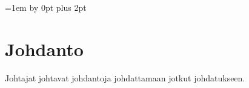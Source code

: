\documentclass[12pt,a4paper]{article}
\begin{document}
%
%
%
%
%

\newpage
\thispagestyle{empty}
\tableofcontents
\newpage
\setcounter{page}{1}
\parskip=1em \advance\parskip by 0pt plus 2pt
\pagestyle{fancy}


\section{Johdanto}
Johtajat johtavat johdantoja johdattamaan jotkut johdatukseen.
\end{document}
